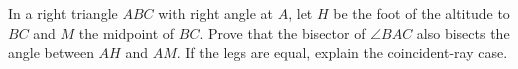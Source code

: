 In a right triangle $ABC$ with right angle at $A$, let $H$ be the foot of the altitude to $BC$ and $M$ the midpoint of $BC$. Prove that the bisector of $\angle BAC$ also bisects the angle between $AH$ and $AM$. If the legs are equal, explain the coincident-ray case.
